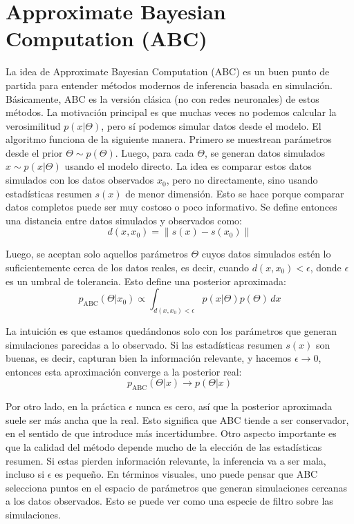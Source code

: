 \section{Approximate Bayesian Computation (ABC)}

La idea de Approximate Bayesian Computation (ABC) \cite{marin2011,sisson2018} es un buen punto de partida para entender métodos modernos de inferencia basada en simulación. Básicamente, ABC es la versión clásica (no con redes neuronales) de estos métodos. La motivación principal es que muchas veces no podemos calcular la verosimilitud $p(x|\Theta)$, pero sí podemos simular datos desde el modelo. El algoritmo funciona de la siguiente manera. Primero se muestrean parámetros desde el prior $\Theta \sim p(\Theta)$. Luego, para cada $\Theta$, se generan datos simulados $x \sim p(x|\Theta)$ usando el modelo directo. La idea es comparar estos datos simulados con los datos observados $x_0$, pero no directamente, sino usando estadísticas resumen $s(x)$ de menor dimensión. Esto se hace porque comparar datos completos puede ser muy costoso o poco informativo. Se define entonces una distancia entre datos simulados y observados como:
\begin{equation}
d(x, x_0) = \| s(x) - s(x_0) \|
\end{equation}

Luego, se aceptan solo aquellos parámetros $\Theta$ cuyos datos simulados estén lo suficientemente cerca de los datos reales, es decir, cuando $d(x, x_0) < \epsilon$, donde $\epsilon$ es un umbral de tolerancia. Esto define una posterior aproximada:
\begin{equation}
p_{\text{ABC}}(\Theta | x_0) \propto \int_{d(x, x_0) < \epsilon} p(x|\Theta)p(\Theta)\, dx
\end{equation}

La intuición es que estamos quedándonos solo con los parámetros que generan simulaciones parecidas a lo observado. Si las estadísticas resumen $s(x)$ son buenas, es decir, capturan bien la información relevante, y hacemos $\epsilon \to 0$, entonces esta aproximación converge a la posterior real:
\[
p_{\text{ABC}}(\Theta | x) \to p(\Theta | x)
\]

Por otro lado, en la práctica $\epsilon$ nunca es cero, así que la posterior aproximada suele ser más ancha que la real. Esto significa que ABC tiende a ser conservador, en el sentido de que introduce más incertidumbre. Otro aspecto importante es que la calidad del método depende mucho de la elección de las estadísticas resumen. Si estas pierden información relevante, la inferencia va a ser mala, incluso si $\epsilon$ es pequeño. En términos visuales, uno puede pensar que ABC selecciona puntos en el espacio de parámetros que generan simulaciones cercanas a los datos observados. Esto se puede ver como una especie de filtro sobre las simulaciones. 